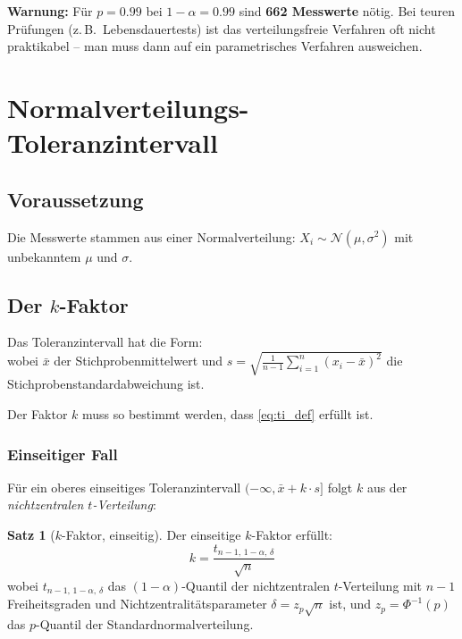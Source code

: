 \documentclass[10pt,a4paper,twocolumn]{article}
\theoremstyle{definition}
\newtheorem{satz}[definition]{Satz}
\newcommand{\warnung}[1]{%
    \begin{center}
    \colorbox{warnred}{\parbox{0.92\linewidth}{\small\textbf{Warnung:} #1}}
    \end{center}
}
\newcommand{\TI}{Toleranzintervall}
\newcommand{\xbar}{\bar{x}}
\begin{document}
\warnung{Für $p=0.99$ bei $1-\alpha=0.99$ sind \textbf{662 Messwerte}
nötig. Bei teuren Prüfungen (z.\,B.\ Lebensdauertests) ist das
verteilungsfreie Verfahren oft nicht praktikabel -- man muss dann
auf ein parametrisches Verfahren ausweichen.}


\section{Normalverteilungs-Toleranzintervall}
\label{sec:normal}

\subsection{Voraussetzung}

Die Messwerte stammen aus einer Normalverteilung:
$X_i \sim \mathcal{N}(\mu, \sigma^2)$ mit unbekanntem $\mu$ und
$\sigma$.

\subsection{Der $k$-Faktor}

Das \TI{} hat die Form:
\begin{equation}
    [\xbar - k \cdot s, \quad \xbar + k \cdot s]
    \label{eq:normal_ti}
\end{equation}
wobei $\xbar$ der Stichprobenmittelwert und
$s = \sqrt{\frac{1}{n-1}\sum_{i=1}^n (x_i - \xbar)^2}$
die Stichprobenstandardabweichung ist.

Der Faktor $k$ muss so bestimmt werden, dass \cref{eq:ti_def}
erfüllt ist.

\subsubsection{Einseitiger Fall}

Für ein oberes einseitiges \TI{} $(-\infty, \xbar + k \cdot s]$
folgt $k$ aus der \emph{nichtzentralen $t$-Verteilung}:

\begin{satz}[$k$-Faktor, einseitig]
\label{satz:k_one}
Der einseitige $k$-Faktor erfüllt:
\begin{equation}
    k = \frac{t_{n-1,\,1-\alpha,\,\delta}}{\sqrt{n}}
    \label{eq:k_one}
\end{equation}
wobei $t_{n-1,\,1-\alpha,\,\delta}$ das $(1-\alpha)$-Quantil der
nichtzentralen $t$-Verteilung mit $n-1$ Freiheitsgraden und
Nichtzentralitätsparameter $\delta = z_p \sqrt{n}$ ist, und
$z_p = \Phi^{-1}(p)$ das $p$-Quantil der Standardnormalverteilung.
\end{satz}
\end{document}

